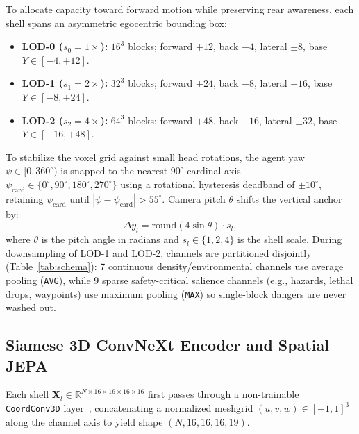 \documentclass[runningheads]{llncs}
\begin{document}
To allocate capacity toward forward motion while preserving rear awareness, each shell spans an asymmetric egocentric bounding box:
\begin{itemize}
    \item \textbf{LOD-0 ($s_0 = 1\times$):} $16^3$ blocks; forward $+12$, back $-4$, lateral $\pm 8$, base $Y \in [-4, +12]$.
    \item \textbf{LOD-1 ($s_1 = 2\times$):} $32^3$ blocks; forward $+24$, back $-8$, lateral $\pm 16$, base $Y \in [-8, +24]$.
    \item \textbf{LOD-2 ($s_2 = 4\times$):} $64^3$ blocks; forward $+48$, back $-16$, lateral $\pm 32$, base $Y \in [-16, +48]$.
\end{itemize}
To stabilize the voxel grid against small head rotations, the agent yaw $\psi \in [0, 360^\circ)$ is snapped to the nearest $90^\circ$ cardinal axis $\psi_{\text{card}} \in \{0^\circ, 90^\circ, 180^\circ, 270^\circ\}$ using a rotational hysteresis deadband of $\pm 10^\circ$, retaining $\psi_{\text{card}}$ until $|\psi - \psi_{\text{card}}| > 55^\circ$. Camera pitch $\theta$ shifts the vertical anchor by:
\begin{equation}
\Delta y_l = \mathrm{round}\left(4 \sin \theta\right) \cdot s_l,
\end{equation}
where $\theta$ is the pitch angle in radians and $s_l \in \{1, 2, 4\}$ is the shell scale. During downsampling of LOD-1 and LOD-2, channels are partitioned disjointly (Table~\ref{tab:schema}): 7 continuous density/environmental channels use average pooling (\texttt{AVG}), while 9 sparse safety-critical salience channels (e.g., hazards, lethal drops, waypoints) use maximum pooling (\texttt{MAX}) so single-block dangers are never washed out.

\subsection{Siamese 3D ConvNeXt Encoder and Spatial JEPA}
Each shell $\mathbf{X}_l \in \mathbb{R}^{N \times 16 \times 16 \times 16 \times 16}$ first passes through a non-trainable \texttt{CoordConv3D} layer~\cite{liu2018coordconv}, concatenating a normalized meshgrid $(u, v, w) \in [-1, 1]^3$ along the channel axis to yield shape $(N, 16, 16, 16, 19)$.
\end{document}
